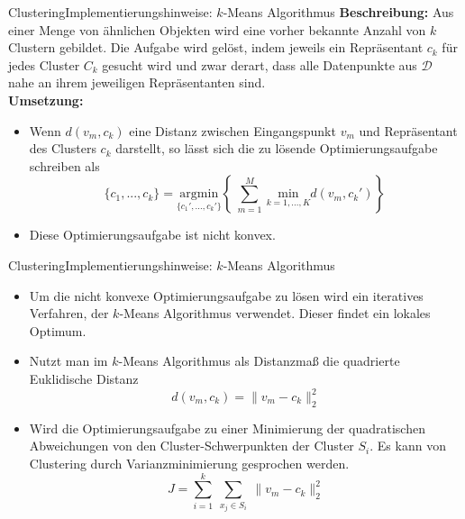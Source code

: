 \documentclass[169, handout	]{THIbeamer} %
\begin{document}
	\begin{frame}{Clustering}{Implementierungshinweise: $k$-Means Algorithmus}
		\textbf{Beschreibung:} Aus einer Menge von ähnlichen Objekten wird eine vorher bekannte Anzahl von $k$ Clustern gebildet. Die Aufgabe wird gelöst, indem jeweils ein Repräsentant $c_k$ für jedes Cluster $C_k$ gesucht wird und zwar derart, dass alle Datenpunkte aus $\mathcal{D}$ nahe an ihrem jeweiligen Repräsentanten sind. \\
		\textbf{Umsetzung:} 
		\begin{itemize}
			\item Wenn $d(v_m, c_k)$ eine Distanz zwischen Eingangspunkt $v_m$ und Repräsentant des Clusters $c_k$ darstellt, so lässt sich die zu lösende Optimierungsaufgabe schreiben als
			\begin{equation}
				\{c_1, ..., c_k\}  = \underset{\{c_1',...,c_k'\}}{\mathrm{argmin}} \left\{\ \sum_{m=1}^M\ \underset{k=1, ...,K}{\mathrm{min}} d(v_m, c_k') \right\}\
			\end{equation}
			\item Diese Optimierungsaufgabe ist nicht konvex.
		\end{itemize}
 	\end{frame}
 	\begin{frame}{Clustering}{Implementierungshinweise: $k$-Means Algorithmus}
 		\begin{itemize}
 			\item Um die nicht konvexe Optimierungsaufgabe zu lösen wird ein iteratives Verfahren, der $k$-Means Algorithmus verwendet. Dieser findet ein lokales Optimum.
 			\item Nutzt man im $k$-Means Algorithmus als Distanzmaß die quadrierte Euklidische Distanz
 			\begin{equation}
 			 	d(v_m, c_k) = \lVert v_m - c_k \rVert_2 ^2
 			\end{equation}
 			\item Wird die Optimierungsaufgabe zu einer Minimierung der quadratischen Abweichungen von den Cluster-Schwerpunkten der Cluster $S_i$. Es kann von Clustering durch Varianzminimierung gesprochen werden. 
 			\begin{equation}
				J = \sum_{i=1}^k\ \sum_{x_j \in S_i}^{}\ \lVert v_m - c_k \rVert_2^2
			\end{equation}
 		\end{itemize}
 	\end{frame}
\end{document}
